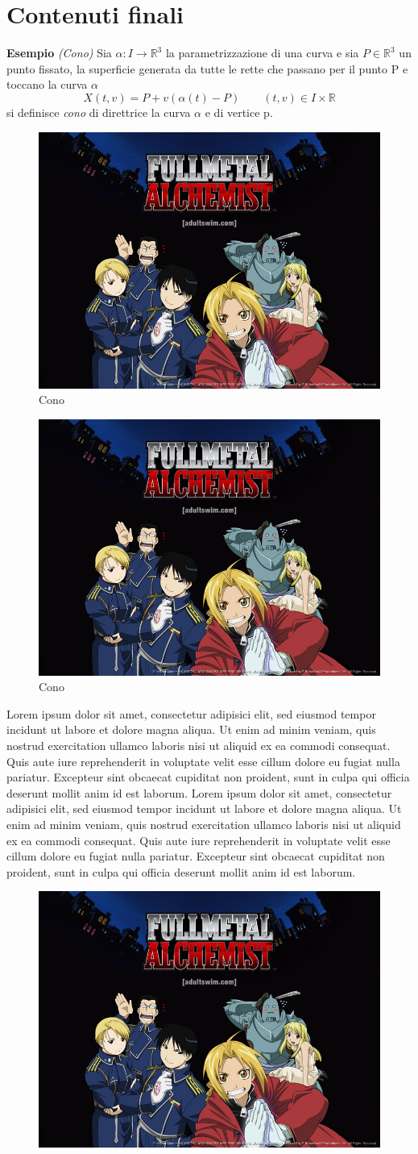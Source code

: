 
\chapter{Contenuti finali}

\textbf{Esempio} \textit{(Cono)} Sia $\alpha: I \rightarrow \mathbb{R}^3$ la parametrizzazione di una curva e sia $P\in\mathbb{R}^3$
un punto fissato, la superficie generata da tutte le rette che passano per il punto P e toccano la curva $\alpha$
$$X(t,v)= P + v(\alpha(t)-P) \qquad (t,v) \in I \times \mathbb{R}$$
si definisce \textit{cono} di direttrice la curva $\alpha$ e di vertice p.


\begin{figure}[!ht]
\centering
\includegraphics[width=3 cm]{fma_group.jpg}
\caption {Cono}
\end{figure}

\begin{figure}
\includegraphics[width=2 cm]{fma_group.jpg}
\caption {Cono}
\end{figure}
Lorem ipsum dolor sit amet, consectetur adipisici elit, sed eiusmod tempor incidunt ut labore et dolore magna aliqua.
 Ut enim ad minim veniam, quis nostrud exercitation ullamco laboris nisi ut aliquid ex ea commodi consequat. Quis aute
 iure reprehenderit in voluptate velit esse cillum dolore eu fugiat nulla pariatur. Excepteur sint obcaecat cupiditat
 non proident, sunt in culpa qui officia deserunt mollit anim id est laborum.
Lorem ipsum dolor sit amet, consectetur adipisici elit, sed eiusmod tempor incidunt ut labore et dolore magna aliqua.
 Ut enim ad minim veniam, quis nostrud exercitation ullamco laboris nisi ut aliquid ex ea commodi consequat. Quis aute
 iure reprehenderit in voluptate velit esse cillum dolore eu fugiat nulla pariatur. Excepteur sint obcaecat cupiditat
 non proident, sunt in culpa qui officia deserunt mollit anim id est laborum.

\begin{figure}
\includegraphics[width=2 cm]{fma_group.jpg}
\end{figure}

